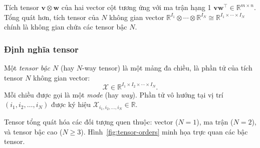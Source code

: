 \begin{remark}
Tích tensor $\mathbf{v} \otimes \mathbf{w}$ của hai vector cột tương ứng với ma trận hạng 1 $\mathbf{v}\mathbf{w}^\top \in \mathbb{R}^{m \times n}$. Tổng quát hơn, tích tensor của $N$ không gian vector $\mathbb{R}^{I_1} \otimes \cdots \otimes \mathbb{R}^{I_N} \cong \mathbb{R}^{I_1 \times \cdots \times I_N}$ chính là không gian chứa các tensor bậc $N$.
\end{remark}

\subsubsection{Định nghĩa tensor}

\begin{definition}
Một \textit{tensor bậc $N$} (hay $N$-way tensor) là một mảng đa chiều, là phần tử của tích tensor $N$ không gian vector:
\begin{equation}
    \mathcal{X} \in \mathbb{R}^{I_1 \times I_2 \times \cdots \times I_N}.
\end{equation}
Mỗi chiều được gọi là một \textit{mode} (hay \textit{way}). Phần tử vô hướng tại vị trí $(i_1, i_2, \ldots, i_N)$ được ký hiệu $\mathcal{X}_{i_1, i_2, \ldots, i_N} \in \mathbb{R}$.
\end{definition}

Tensor tổng quát hóa các đối tượng quen thuộc: vector ($N=1$), ma trận ($N=2$), và tensor bậc cao ($N \geq 3$). Hình~\ref{fig:tensor-orders} minh họa trực quan các bậc tensor.

